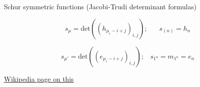 \documentclass[12pt]{amsart}
\begin{document}
\begin{mdframed}[linecolor=cyan!20, linewidth=3pt]
	\begin{bf}Schur symmetric functions (Jacobi-Trudi determinant formulas)\end{bf}

	\vspace{-20pt}\begin{minipage}[t]{9.35cm}
		\begin{equation} s_\mu=\mathrm{det}\left( (h_{\mu_i-i+j})_{i,j}\right);\hspace{20pt} s_{(n)}=h_n
		\end{equation}
	\end{minipage}
	\begin{minipage}[t]{10.25cm}
		\begin{equation} s_{\mu'}=\mathrm{det}\left( (e_{\mu_i-i+j})_{i,j}\right); \hspace{10pt} s_{1^n}=m_{1^n}=e_n
		\end{equation}
	\end{minipage}

	 \hyperref[symf]{Wikipedia page on this} 
\end{mdframed}

\newpage
\end{document}
